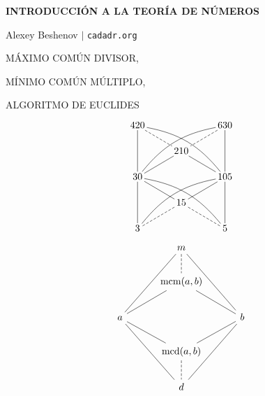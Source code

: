 



\begin{frame}
  \textbf{INTRODUCCIÓN A LA TEORÍA DE NÚMEROS}

  Alexey Beshenov $\mid$ \texttt{cadadr.org}

  \vfill

  \begin{center}\huge\headingfont
    MÁXIMO COMÚN DIVISOR,

    \vspace{0.5em}

    MÍNIMO COMÚN MÚLTIPLO,

    \vspace{0.5em}

    ALGORITMO DE EUCLIDES
  \end{center}

  \vfill
\end{frame}

\begin{frame}[fragile]
  \vfill

  \[ \begin{tikzcd}[row sep=2em, column sep=3em, cells={inner sep=0pt, outer sep=2pt}]
      420\ar[-]{dd}\ar[dashed,-]{dr}\ar[bend left=20,-]{ddrr} & & 630\ar[-]{dd}\ar[dashed,-]{dl}\ar[bend right=20,-]{ddll} \\
      & 210\ar[-]{dl}\ar[-]{dr} \\
      30\ar[-]{dr}\ar[-]{dd}\ar[bend left=20,-]{ddrr} && 105\ar[-]{dl}\ar[-]{dd}\ar[bend right=20,-]{ddll} \\
      & 15\ar[dashed,-]{dl}\ar[dashed,-]{dr} \\
      3 & & 5
    \end{tikzcd} \]

  \vfill
\end{frame}

\begin{frame}[fragile]
  \vfill

  \[ \begin{tikzcd}[row sep=2em, column sep=3em]
      & m\ar[dashed,-]{d}\ar[-]{ddl}\ar[-]{ddr} \\
      & \mcm (a,b)\ar[-]{dl}\ar[-]{dr} \\
      a\ar[-]{dr}\ar[-]{ddr} && b\ar[-]{dl}\ar[-]{ddl} \\
      & \mcd (a,b)\ar[dashed,-]{d} \\
      & d
    \end{tikzcd} \]

  \vfill
\end{frame}

